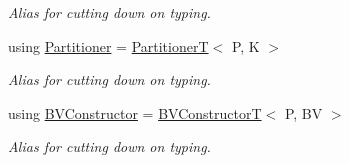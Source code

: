 \begin{DoxyCompactItemize}
\begin{DoxyCompactList}\small\item\em Alias for cutting down on typing. \end{DoxyCompactList}\item 
\mbox{\label{classBVH_1_1NodeT_a3bb028655b8b961fa35109af1c14f281}} 
using \hyperlink{classBVH_1_1NodeT_a3bb028655b8b961fa35109af1c14f281}{Partitioner} = \hyperlink{namespaceBVH_a7c33d54da9893d506709b2ca96b76f55}{PartitionerT}$<$ P, K $>$
\begin{DoxyCompactList}\small\item\em Alias for cutting down on typing. \end{DoxyCompactList}\item 
\mbox{\label{classBVH_1_1NodeT_a2340f2466ed5b6eebab4bdc72004858e}} 
using \hyperlink{classBVH_1_1NodeT_a2340f2466ed5b6eebab4bdc72004858e}{B\+V\+Constructor} = \hyperlink{namespaceBVH_a245702d7eff40cdaedb5dff68c25a88a}{B\+V\+ConstructorT}$<$ P, BV $>$
\begin{DoxyCompactList}\small\item\em Alias for cutting down on typing. \end{DoxyCompactList}\end{DoxyCompactItemize}
